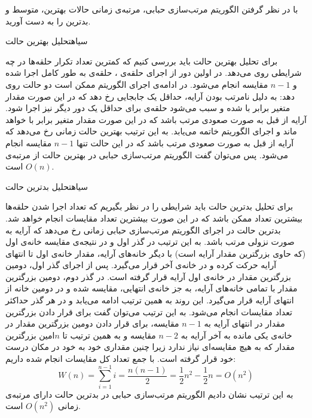 {با در نظر گرفتن الگوریتم مرتب‌سازی حبابی، مرتبه‌ی زمانی حالات بهترین، متوسط و بدترین را به دست آورید.


‌سیاه{تحلیل بهترین حالت}

برای تحلیل بهترین حالت باید بررسی کنیم که کمترین تعداد تکرار حلقه‌ها در چه شرایطی روی می‌دهد.  در اولین دور از اجرای حلقه‌ی ، حلقه‌ی  به طور کامل اجرا شده و {$n-1$} مقایسه انجام می‌شود. در ادامه‌ی اجرای الگوریتم ممکن است دو حالت روی دهد:
 به دلیل نامرتب بودن آرایه‌، حداقل یک جابجایی رخ دهد که در این صورت مقدار متغیر {} برابر با {} شده و سبب می‌شود حلقه‌ی  برای حداقل یک دور دیگر نیز اجرا شود. 
 آرایه‌ از قبل به صورت صعودی مرتب باشد که در این صورت مقدار متغیر {} برابر با {} خواهد ماند و اجرای الگوریتم خاتمه می‌یابد.
به این ترتیب بهترین حالت زمانی رخ می‌دهد که آرایه از قبل به صورت صعودی مرتب باشد که در این حالت تنها {$n-1$} مقایسه انجام می‌شود. پس می‌توان گفت الگوریتم مرتب‌سازی حبابی در بهترین حالت از مرتبه‌ی {$O(n)$} است.

‌سیاه{تحلیل بدترین حالت}

برای تحلیل بدترین حالت باید شرایطی را در نظر بگیریم که تعداد اجرا شدن حلقه‌ها بیشترین تعداد ممکن باشد که در این صورت بیشترین تعداد مقایسات انجام خواهد شد. بدترین حالت در اجرای الگوریتم مرتب‌سازی حبابی زمانی رخ می‌دهد که آرایه به صورت نزولی مرتب باشد. به این ترتیب در گذر اول و در نتیجه‌ی مقایسه خانه‌ی اول (که حاوی بزرگترین مقدار آرایه است) با دیگر خانه‌های آرایه، مقدار خانه‌ی اول تا انتهای آرایه حرکت کرده و در خانه‌ی آخر قرار می‌گیرد. پس از اجرای گذر اول، دومین بزرگترین مقدار در خانه‌ی اول آرایه قرار گرفته است. در گذر دوم، دومین بزرگترین مقدار با تمامی خانه‌های آرایه، به جز خانه‌ی انتهایی، مقایسه شده و در دومین خانه از انتهای آرایه قرار می‌گیرد. این روند به همین ترتیب ادامه می‌یابد و در هر گذر حداکثر تعداد مقایسات انجام می‌شود. به این ترتیب می‌توان گفت برای قرار دادن بزرگترین مقدار در انتهای آرایه به {$n-1$} مقایسه، برای قرار دادن دومین بزرگترین مقدار در خانه‌ی یکی مانده به آخر آرایه به {$n-2$} مقایسه و به همین ترتیب تا {$n$}امین بزرگترین مقدار که به هیچ مقایسه‌ای نیاز ندارد زیرا چنین مقداری خود به خود در مکان درست خود قرار گرفته است. با جمع تعداد کل مقایسات انجام شده داریم:
\begin{displaymath}
W(n)=\sum_{i=1}^{n-1}{i}=\dfrac{n(n-1)}{2}=\dfrac{1}{2}n^2 - \dfrac{1}{2}n=O(n^2)
\end{displaymath}
به این ترتیب نشان دادیم الگوریتم مرتب‌سازی حبابی در بدترین حالت دارای مرتبه‌ی زمانی {$O(n^2)$} است.

}
